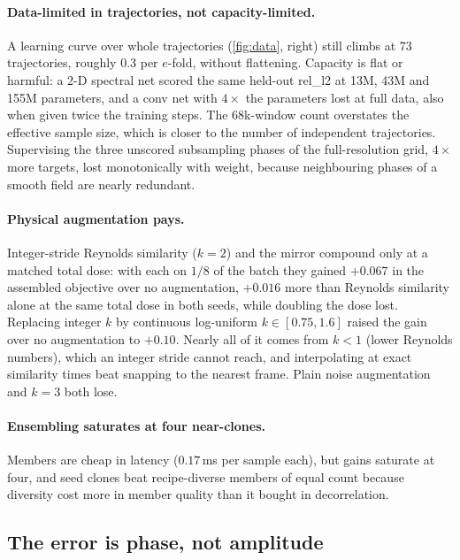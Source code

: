 \documentclass[10pt]{article}
\begin{document}
\paragraph{Data-limited in trajectories, not capacity-limited.} A learning curve over whole trajectories (\cref{fig:data}, right) still climbs at 73 trajectories, roughly $0.3$ per $e$-fold, without flattening. Capacity is flat or harmful: a 2-D spectral net scored the same held-out rel\_l2 at 13M, 43M and 155M parameters, and a conv net with $4\times$ the parameters lost at full data, also when given twice the training steps. The 68k-window count overstates the effective sample size, which is closer to the number of independent trajectories. Supervising the three unscored subsampling phases of the full-resolution grid, $4\times$ more targets, lost monotonically with weight, because neighbouring phases of a smooth field are nearly redundant.

\paragraph{Physical augmentation pays.} Integer-stride Reynolds similarity ($k=2$) and the mirror compound only at a matched total dose: with each on $1/8$ of the batch they gained $+0.067$ in the assembled objective over no augmentation, $+0.016$ more than Reynolds similarity alone at the same total dose in both seeds, while doubling the dose lost. Replacing integer $k$ by continuous log-uniform $k\in[0.75,1.6]$ raised the gain over no augmentation to $+0.10$. Nearly all of it comes from $k<1$ (lower Reynolds numbers), which an integer stride cannot reach, and interpolating at exact similarity times beat snapping to the nearest frame. Plain noise augmentation and $k=3$ both lose.

\paragraph{Ensembling saturates at four near-clones.} Members are cheap in latency ($0.17$\,ms per sample each), but gains saturate at four, and seed clones beat recipe-diverse members of equal count because diversity cost more in member quality than it bought in decorrelation.

\subsection{The error is phase, not amplitude}
\label{sec:phase}
\end{document}
